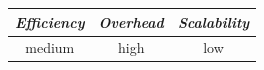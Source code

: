 %
%
%
%
%
%
%

%
%
%

\begin{center}
\begin{tabular}{ccc}
\emph{Efficiency} & \emph{Overhead} & \emph{Scalability} \\
\hline
medium &
high &
low
\end{tabular}
\end{center}

